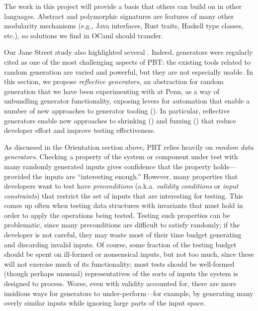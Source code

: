The work in this project will provide a basis that others can build on
in other languages. Abstract and polymorphic signatures are features
of many other modularity mechanisms (e.g., Java interfaces, Rust
traits, Haskell type classes, etc.), so solutions we find in OCaml
should transfer.  



%
Our Jane Street study also highlighted several .
Indeed, generators were regularly cited as one of the most challenging
aspects of PBT: the existing tools related to random generation are varied
and powerful, but
they are not especially usable.  In this section, we propose {\em reflective
generators}, an abstraction for random generation that we have been
experimenting with at Penn, as a way of unbundling generator
functionality, exposing levers for
automation that enable a number of new approaches to generator
tooling (). In particular, reflective
generators enable new
approaches to shrinking () and fuzzing
() that reduce developer effort and improve testing
effectiveness.

As discussed in the Orientation section above, PBT relies heavily on {\em random data
generators}.  Checking a property of the system or component under
test with many randomly generated inputs gives confidence that the property
holds---provided the inputs are ``interesting enough.''
%
However,
many properties that developers want to test have {\em preconditions}
(a.k.a.{} {\em validity conditions} or {\em input constraints}) that
restrict the set of inputs that are interesting for testing. This comes up often
when testing data structures with invariants that must hold in order to apply
the operations being tested. Testing such properties can be problematic, since
many preconditions are difficult to satisfy randomly; if the developer is not
careful, they may waste most of their time budget generating and
discarding invalid inputs.
%
Of course, some fraction of the testing budget should be spent on
ill-formed or nonsensical inputs, but not too much, since these will not
exercise much of its functionality; most tests should be well-formed
(though perhaps unusual) representatives of the sorts of inputs the
system is designed to process.
%
Worse, even with validity accounted for, there are
more insidious ways for generators to under-perform---for example, by
generating many overly similar inputs while ignoring large parts of
the input space.

